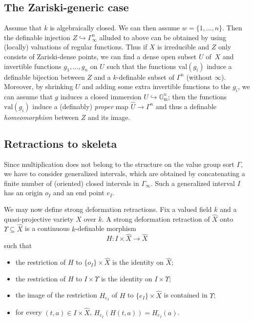 \documentclass[JEP,XML,SOM,Unicode,ThmDefs,NoEqCountersInSection,published]{cedram}
\newcommand{\val}{\mathrm{val}}
\newcommand{\gm}{\bG_{\mathrm m}}
\newcommand{\bG}{\mathbb G}
\theoremstyle{plain}
\theoremstyle{definition}
\begin{document}
\subsection{The Zariski-generic case}\label{gamma-internal-generic}
Assume that $k$ is algebraically closed. We can then assume
$w = \{1, \ldots, n\}$. Then the definable injection $Z\hookrightarrow \Gamma_\infty^n$
alluded to above can be obtained by using (locally) valuations of regular
functions. Thus if $X$ is irreducible and $Z$ only consists of Zariski-dense points, we can find a dense open subset $U$
of~$X$ and invertible functions
$g_1,\ldots, g_n$ on $U$ such that the functions $\val (g_i)$ induce a definable bijection between $Z$ and a $k$-definable subset of $\Gamma^n$
(without $\infty$). Moreover, by shrinking $U$
and adding some extra invertible functions to the $g_i$, we can assume that $g$ induces a closed immersion $U\hookrightarrow \gm^n$; then
the functions $\val (g_i)$ induce a (definably) \textit{proper} map $\widehat U\to \Gamma^n$ and thus a definable
\textit{homeomorphism}
between $Z$ and its image.

\subsection{Retractions to skeleta}Since multiplication does not belong to the structure on the value group sort $\Gamma$, we have to consider generalized intervals, which are
obtained by concatenating a finite number of (oriented) closed intervals in $\Gamma_\infty$.
Such a generalized interval $I$ has an origin $o_I$ and an end point $e_I$.

We may now define strong deformation retractions. Fix a valued field $k$ and a quasi-projective variety $X$ over $k$.
A strong deformation retraction of $\widehat{X}$ onto $\Upsilon \subseteq \widehat{X}$ is a continuous $k$-definable morphism
\[
H: I \times \widehat{X} \longrightarrow \widehat{X}
\]
such that
\begin{itemize}
\item the restriction of $H$ to $\{o_I\} \times \widehat{X}$ is the identity on $\widehat{X}$;
\item the restriction of $H$ to $I \times \Upsilon$ is the identity on $I \times \Upsilon$;
\item the image of the restriction $H_{e_I}$ of $H$ to $\{e_I\} \times \widehat{X}$ is contained in $\Upsilon$;
\item for every $(t, a) \in I \times \widehat{X}$, $H_{e_I} (H(t, a)) = H_{e_I} (a)$.
\end{itemize}
\end{document}
